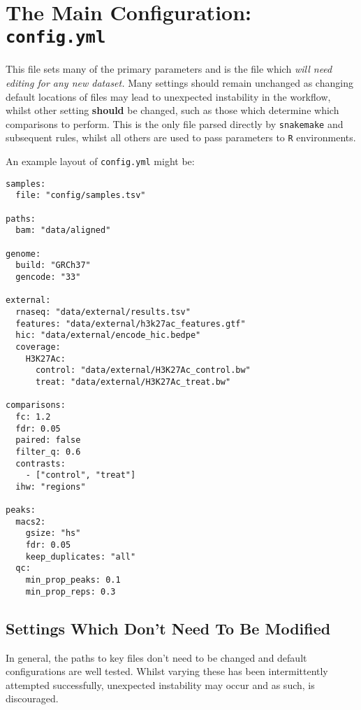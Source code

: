 \documentclass[
]{book}
\begin{document}
\hypertarget{config-yml}{%
\section{\texorpdfstring{The Main Configuration: \texttt{config.yml}}{The Main Configuration: config.yml}}\label{config-yml}}

This file sets many of the primary parameters and is the file which \emph{will need editing for any new dataset.}
Many settings should remain unchanged as changing default locations of files may lead to unexpected instability in the workflow, whilst other setting \textbf{should} be changed, such as those which determine which comparisons to perform.
This is the only file parsed directly by \texttt{snakemake} and subsequent rules, whilst all others are used to pass parameters to \texttt{R} environments.

An example layout of \texttt{config.yml} might be:

\begin{verbatim}
samples:
  file: "config/samples.tsv"

paths:
  bam: "data/aligned"

genome:
  build: "GRCh37"
  gencode: "33"

external:
  rnaseq: "data/external/results.tsv"
  features: "data/external/h3k27ac_features.gtf"
  hic: "data/external/encode_hic.bedpe"
  coverage:
    H3K27Ac:
      control: "data/external/H3K27Ac_control.bw"
      treat: "data/external/H3K27Ac_treat.bw"

comparisons:
  fc: 1.2
  fdr: 0.05
  paired: false
  filter_q: 0.6
  contrasts:
    - ["control", "treat"]
  ihw: "regions"

peaks:
  macs2:
    gsize: "hs"
    fdr: 0.05
    keep_duplicates: "all"
  qc:
    min_prop_peaks: 0.1
    min_prop_reps: 0.3
\end{verbatim}

\hypertarget{settings-which-dont-need-to-be-modified}{%
\subsection*{Settings Which Don't Need To Be Modified}\label{settings-which-dont-need-to-be-modified}}

In general, the paths to key files don't need to be changed and default configurations are well tested.
Whilst varying these has been intermittently attempted successfully, unexpected instability may occur and as such, is discouraged.
\end{document}
